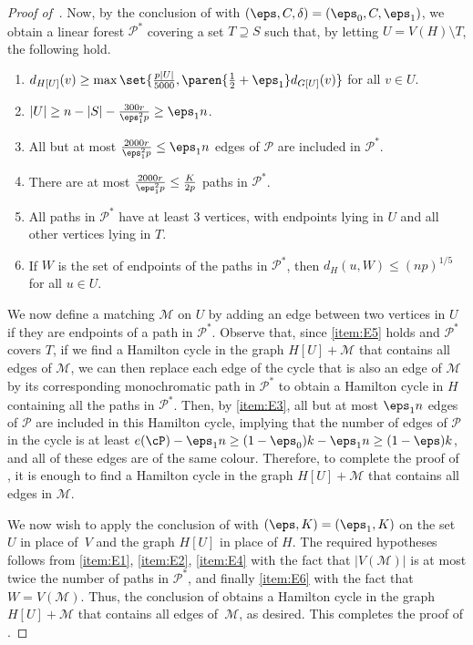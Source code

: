 \documentclass[10pt,a4paper,reqno]{amsart}
\begin{document}
\begin{proof}[Proof of~]
Now, by the conclusion of  with $(\eps, C, \delta) = (\eps_0, C, \eps_1)$, we obtain a linear forest $\mathcal{P}^*$ covering a set $T \supseteq S$ such that, by letting $U = V(H) \setminus T$, the following hold.
\begin{enumerate}[leftmargin=*,label = {\bfseries E\arabic{enumi}}]
  \item $d_{H[U]}(v) \geq \max\set{\frac{p|U|}{5000}, \paren{\frac{1}{2} + \eps_1}d_{G[U]}(v)}$ for all $v \in U$.
  \label{item:E1}
  \item $|U| \geq n - |S| - \frac{300r}{\eps_1^2 p} \geq \eps_1 n$.
  \label{item:E2}
  \item All but at most $\frac{2000r}{\eps_1^2 p} \le \eps_1 n$ edges of $\mathcal{P}$ are included in $\mathcal{P}^*$.
  \label{item:E3}
  \item There are at most $\frac{2000r}{\eps_1^2 p}\le \frac{K}{2p}$ paths in $\mathcal{P}^*$.
  \label{item:E4}
  \item All paths in $\mathcal{P}^*$ have at least $3$ vertices, with endpoints lying in $U$ and all other vertices lying in $T$.
  \label{item:E5}
  \item If $W$ is the set of endpoints of the paths in $\mathcal{P}^*$, then $d_H(u, W) \leq (np)^{1 / 5}$ for all $u \in U$.
  \label{item:E6}
\end{enumerate}
  
We now define a matching $\mathcal{M}$ on $U$ by adding an edge between two vertices in $U$ if they are endpoints of a path in $\mathcal{P}^*$. Observe that, since \ref{item:E5} holds and $\mathcal{P}^*$ covers $T$, if we find a Hamilton cycle in the graph $H[U] + \mathcal{M}$ that contains all edges of $\mathcal{M}$, we can then replace each edge of the cycle that is also an edge of $\mathcal{M}$ by its corresponding monochromatic path in $\mathcal{P}^*$ to obtain a Hamilton cycle in $H$ containing all the paths in $\mathcal{P}^*$. Then, by \ref{item:E3}, all but at most $\eps_1 n$ edges of $\mathcal{P}$ are included in this Hamilton cycle, implying that the number of edges of $\mathcal{P}$ in the cycle is at least $e(\cP) - \eps_1 n \geq (1 - \eps_0)k - \eps_1 n \ge (1 - \eps) k$, and all of these edges are of the same colour. Therefore, to complete the proof of , it is enough to find a Hamilton cycle in the graph $H[U] + \mathcal{M}$ that contains all edges in $\mathcal{M}$.

We now wish to apply the conclusion of  with $(\eps, K) = (\eps_1, K)$ on the set $U$ in place of~$V$ and the graph $H[U]$ in place of $H$. The required hypotheses follows from \ref{item:E1}, \ref{item:E2}, \ref{item:E4} with the fact that $|V(\mathcal{M})|$ is at most twice the number of paths in $\mathcal{P}^*$, and finally \ref{item:E6} with the fact that $W=V(\mathcal{M})$. Thus, the conclusion of  obtains a Hamilton cycle in the graph $H[U] + \mathcal{M}$ that contains all edges of~$\mathcal{M}$, as desired. This completes the proof of .
\end{proof}
\end{document}
